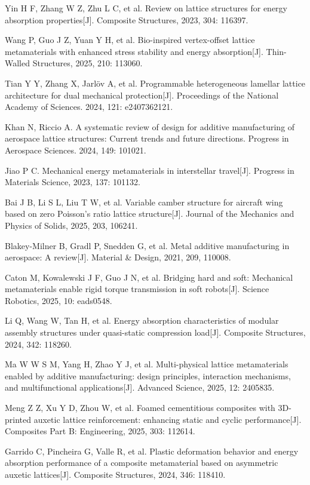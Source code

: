 \documentclass{article} %
\begin{document}
\noindent [2] Yin H F, Zhang W Z, Zhu L C, et al. Review on lattice structures for energy absorption properties[J]. Composite Structures, 2023, 304: 116397.

\noindent [3] Wang P, Guo J Z, Yuan Y H, et al. Bio-inspired vertex-offset lattice metamaterials with enhanced stress stability and energy absorption[J]. Thin-Walled Structures, 2025, 210: 113060.

\noindent [4] Tian Y Y, Zhang X, Jarl\"{o}v A, et al. Programmable heterogeneous lamellar lattice architecture for dual mechanical protection[J]. Proceedings of the National Academy of Sciences. 2024, 121: e2407362121.

\noindent [5] Khan N, Riccio A. A systematic review of design for additive manufacturing of aerospace lattice structures: Current trends and future directions. Progress in Aerospace Sciences. 2024, 149: 101021.

\noindent [6] Jiao P C. Mechanical energy metamaterials in interstellar travel[J]. Progress in Materials Science, 2023, 137: 101132.

\noindent [7] Bai J B, Li S L, Liu T W, et al. Variable camber structure for aircraft wing based on zero Poisson's ratio lattice structure[J]. Journal of the Mechanics and Physics of Solids, 2025, 203, 106241.

\noindent [8] Blakey-Milner B, Gradl P, Snedden G, et al. Metal additive manufacturing in aerospace: A review[J]. Material \& Design, 2021, 209, 110008.

\noindent [9] Caton M, Kowalewski J F, Guo J N, et al. Bridging hard and soft: Mechanical metamaterials enable rigid torque transmission in soft robots[J]. Science Robotics, 2025, 10: eads0548.

\noindent [10] Li Q, Wang W, Tan H, et al. Energy absorption characteristics of modular assembly structures under quasi-static compression load[J]. Composite Structures, 2024, 342: 118260.

\noindent [11] Ma W W S M, Yang H, Zhao Y J, et al. Multi-physical lattice metamaterials enabled by additive manufacturing: design principles, interaction mechanisms, and multifunctional applications[J]. Advanced Science, 2025, 12: 2405835.

\noindent [12] Meng Z Z, Xu Y D, Zhou W, et al. Foamed cementitious composites with 3D-printed auxetic lattice reinforcement: enhancing static and cyclic performance[J]. Composites Part B: Engineering, 2025, 303: 112614.

\noindent [13] Garrido C, Pincheira G, Valle R, et al. Plastic deformation behavior and energy absorption performance of a composite metamaterial based on asymmetric auxetic lattices[J]. Composite Structures, 2024, 346: 118410.
\end{document}
